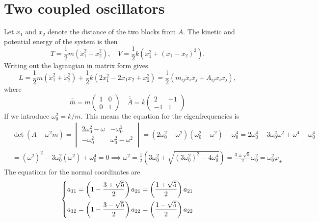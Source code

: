 \documentclass{article}
\begin{document}
    \section{Two coupled oscillators}
    Let $x_1$ and $x_2$ denote the distance of the two blocks from $A$. The kinetic and potential energy of the system is then
    \begin{equation*}
        T = \frac{1}{2}m(\dot x_1^2 + \dot x_2^2), \quad V = \frac{1}{2} k (x_1^2 + (x_1 - x_2)^2).
    \end{equation*}
    Writing out the lagrangian in matrix form gives
    \begin{equation*}
        L = \frac{1}{2}m(\dot x_1^2 + \dot x_2^2) + \frac{1}{2}k (2  x_1^2 - 2 x_1  x_2 + x_2^2) = \frac{1}{2}\left(m_{ij}\dot x_i \dot x_j + A_{ij} x_i x_j\right),
    \end{equation*}
    where
    \begin{equation*}
        \bar {\bar m} = m
        \begin{pmatrix}
            1 & 0 \\
            0 & 1 
        \end{pmatrix}
        \quad \bar {\bar A} = k
        \begin{pmatrix*}
            2 & -1 \\
            -1 & 1
        \end{pmatrix*}
    \end{equation*}
    If we introduce $\omega_0^2 = k/m$. This means the equation for the eigenfrequencies is
    \begin{align*} & \det(A - \omega^2m) = 
        \begin{vmatrix}
            2\omega_0^2 - \omega& -\omega_0^2 \\
            -\omega_0^2 & \omega_0^2 - \omega^2
        \end{vmatrix}
        = (2\omega_0^2 - \omega^2)(\omega_0^2 - \omega^2) - \omega_0^4 = 2\omega_0^4 - 3 \omega_0^2\omega^2 + \omega^4 - \omega_0^4 \\
        & = (\omega^2)^2 - 3\omega_0^2(\omega^2) + \omega_0^4 =0 \implies \omega^2 = \frac{1}{2} \left(3\omega_0^2 \pm \sqrt{(3\omega_0^2)^2 - 4\omega_0^4}\right) = \frac{3 \pm \sqrt{5}}{2}\omega_0^2 = \omega_0^2 \varphi_\pm
    \end{align*}
    The equations for the normal coordinates are
    \begin{equation*}
        \begin{dcases*}
            a_{11} = \left(1 - \frac{3 + \sqrt{5}}{2}\right)a_{21} = \left(\frac{1 + \sqrt{5}}{2}\right)a_{21}\\
            a_{12} = \left(1 - \frac{3 - \sqrt{5}}{2}\right)a_{22} = \left(\frac{1 - \sqrt{5}}{2}\right)a_{22}\\
        \end{dcases*}
    \end{equation*}
\end{document}
